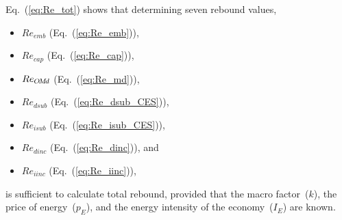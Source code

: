 Eq.~(\ref{eq:Re_tot}) shows that determining seven rebound values,

\begin{itemize}

  \item $Re_{emb}$ (Eq.~(\ref{eq:Re_emb})),

  \item $Re_{cap}$ (Eq.~(\ref{eq:Re_cap})),

  \item $Re_{O\!M\!d}$ (Eq.~(\ref{eq:Re_md})),

  \item $Re_{dsub}$ (Eq.~(\ref{eq:Re_dsub_CES})),

  \item $Re_{isub}$ (Eq.~(\ref{eq:Re_isub_CES})),

  \item $Re_{dinc}$ (Eq.~(\ref{eq:Re_dinc})), and

  \item $Re_{iinc}$ (Eq.~(\ref{eq:Re_iinc})),

\end{itemize}
%
is sufficient to calculate total rebound,
provided that
the macro factor~($k$),
the price of energy~($p_E$), and
the energy intensity of the economy~($I_E$)
are known.
